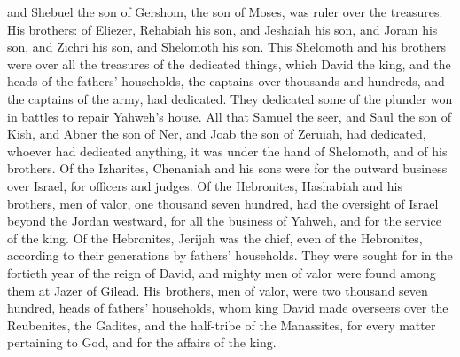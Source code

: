 {and Shebuel the son of Gershom, the son of Moses, was ruler over the treasures.
His brothers: of Eliezer, Rehabiah his son, and Jeshaiah his son, and Joram his son, and Zichri his son, and Shelomoth his son.
This Shelomoth and his brothers were over all the treasures of the dedicated things, which David the king, and the heads of the fathers’ households, the captains over thousands and hundreds, and the captains of the army, had dedicated.
They dedicated some of the plunder won in battles to repair Yahweh’s house.
All that Samuel the seer, and Saul the son of Kish, and Abner the son of Ner, and Joab the son of Zeruiah, had dedicated, whoever had dedicated anything, it was under the hand of Shelomoth, and of his brothers.
Of the Izharites, Chenaniah and his sons were for the outward business over Israel, for officers and judges.
Of the Hebronites, Hashabiah and his brothers, men of valor, one thousand seven hundred, had the oversight of Israel beyond the Jordan westward, for all the business of Yahweh, and for the service of the king.
Of the Hebronites, Jerijah was the chief, even of the Hebronites, according to their generations by fathers’ households. They were sought for in the fortieth year of the reign of David, and mighty men of valor were found among them at Jazer of Gilead.
His brothers, men of valor, were two thousand seven hundred, heads of fathers’ households, whom king David made overseers over the Reubenites, the Gadites, and the half-tribe of the Manassites, for every matter pertaining to God, and for the affairs of the king.

}
